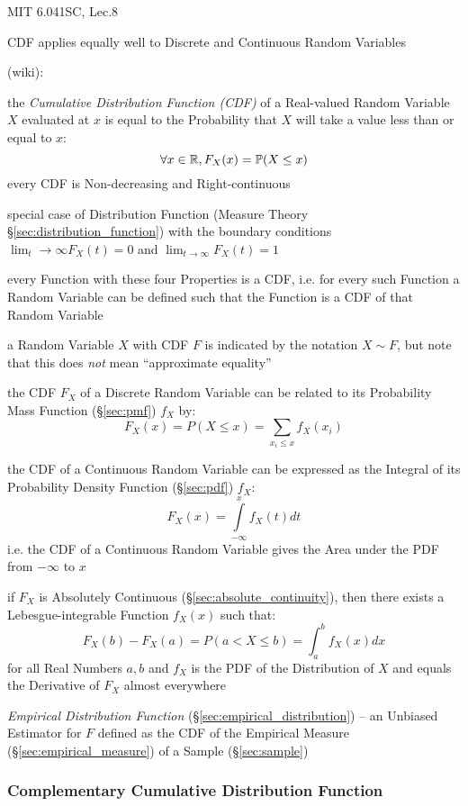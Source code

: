 MIT 6.041SC, Lec.8

CDF applies equally well to Discrete and Continuous Random Variables

(wiki):

the \emph{Cumulative Distribution Function (CDF)} of a Real-valued Random
Variable $X$ evaluated at $x$ is equal to the Probability that $X$ will take a
value less than or equal to $x$:
\[
  \forall x \in \mathbb{R}, F_X(x) = \mathbb{P}(X \leq x)
\]
every CDF is Non-decreasing and Right-continuous

special case of Distribution Function (Measure Theory
\S\ref{sec:distribution_function}) with the boundary conditions
$\lim_t\to\infty F_X(t) = 0$ and $\lim_{t\to\infty}F_X(t) = 1$

every Function with these four Properties is a CDF, i.e. for every such Function
a Random Variable can be defined such that the Function is a CDF of that Random
Variable

a Random Variable $X$ with CDF $F$ is indicated by the notation $X \sim F$, but
note that this does \emph{not} mean ``approximate equality''

the CDF $F_X$ of a Discrete Random Variable can be related to its Probability
Mass Function (\S\ref{sec:pmf}) $f_X$ by:
\[
  F_X(x) = P(X \leq x) = \sum_{x_i \leq x} f_X(x_i)
\]

the CDF of a Continuous Random Variable can be expressed as the Integral of its
Probability Density Function (\S\ref{sec:pdf}) $f_X$:
\[
  F_X(x) = \int\limits_{-\infty}^x f_X(t) dt
\]
i.e. the CDF of a Continuous Random Variable gives the Area under the PDF from
$-\infty$ to $x$

if $F_X$ is Absolutely Continuous (\S\ref{sec:absolute_continuity}), then there
exists a Lebesgue-integrable Function $f_X(x)$ such that:
\[
  F_X(b) - F_X(a) = P(a < X \leq b) = \int_a^b f_X(x) dx
\]
for all Real Numbers $a, b$ and $f_X$ is the PDF of the Distribution of $X$
and equals the Derivative of $F_X$ almost everywhere

\fist \emph{Empirical Distribution Function}
(\S\ref{sec:empirical_distribution}) -- an Unbiased Estimator for $F$ defined as
the CDF of the Empirical Measure (\S\ref{sec:empirical_measure}) of a Sample
(\S\ref{sec:sample})



\subsubsection{Complementary Cumulative Distribution Function}
\label{sec:complementary_cumulative}

